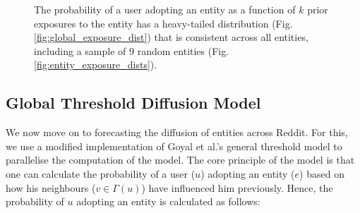 \documentclass[journal,10pt,draftclsnofoot,onecolumn]{IEEEtran}
\begin{document}
\begin{figure}[ht!]
  \begin{center}
  \end{center}    
  \caption{The probability of a user adopting an entity as a function of $k$ prior exposures to the entity has a heavy-tailed distribution (Fig. \ref{fig:global_exposure_dist}) that is consistent across all entities, including a sample of 9 random entities (Fig. \ref{fig:entity_exposure_dists}).}
  \label{fig:exposure_dists}
\end{figure}


\subsection{Global Threshold Diffusion Model}
We now move on to forecasting the diffusion of entities across Reddit.
For this, we use a modified implementation of Goyal et al.'s general threshold model \cite{goyal2010learning} to parallelise the computation of the model.
The core principle of the model is that one can calculate the probability of a user ($u$) adopting an entity ($e$) based on how his neighbours ($v \in \Gamma(u)$) have influenced him previously.
Hence, the probability of $u$ adopting an entity is calculated as follows:
\end{document}

